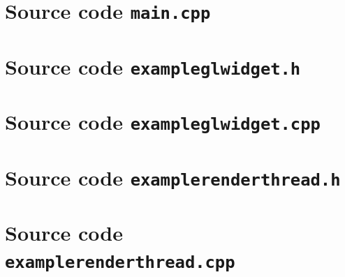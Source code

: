 \documentclass[jou,noapacite]{apa}
\begin{document}
\appendix
\onecolumn
{}

\section{Source code \texttt{main.cpp}}

\newpage

\section{Source code \texttt{exampleglwidget.h}}

\newpage

\section{Source code \texttt{exampleglwidget.cpp}}

\newpage

\section{Source code \texttt{examplerenderthread.h}}

\newpage

\section{Source code \texttt{examplerenderthread.cpp}}

\newpage
\end{document}
